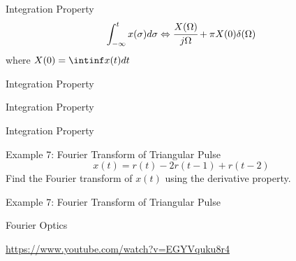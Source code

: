 \documentclass[aspectratio=169,xcolor=dvipsnames,svgnames,x11names,fleqn]{beamer}
\begin{document}
\begin{frame}{Integration Property}
    $$
    \int_{-\infty}^t x(\sigma) d\sigma \Leftrightarrow \cfrac{X(\Omega)}{j\Omega} + \pi X(0)\delta(\Omega)
    $$
    where $X(0) = \intinf x(t)dt$
\end{frame}

\begin{frame}{Integration Property}
\vspace*{-7\baselineskip}
    \color{LightGray}{Blank space for calculation}
\end{frame}
\begin{frame}{Integration Property}
\vspace*{-7\baselineskip}
    \color{LightGray}{Blank space for calculation}
\end{frame}
\begin{frame}{Integration Property}
\vspace*{-7\baselineskip}
    \color{LightGray}{Blank space for calculation}
\end{frame}


\begin{frame}{Example 7: Fourier Transform of Triangular Pulse}
    $$x(t) = r(t) - 2r(t-1) + r(t-2)$$
    Find the Fourier transform of $x(t)$ using the derivative property.
    
\end{frame}

\begin{frame}{Example 7: Fourier Transform of Triangular Pulse}
\vspace*{-7\baselineskip}
    \color{LightGray}{Blank space for calculation}
\end{frame}



\begin{frame}{Fourier Optics}

    \Large
    \begin{center}
        \url{https://www.youtube.com/watch?v=EGYVquku8r4}
    \end{center}
\end{frame}
\end{document}
